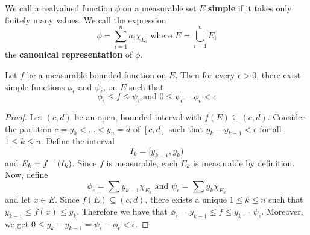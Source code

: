 \begin{definition}
    We call a realvalued function $\phi$ on a measurable set $E$ \textbf{simple}
    if it takes only finitely many values. We call the expression
    \begin{equation*}
        \phi=\sum_{i=1}^n{a_i\chi_E_i} \text{ where } E=\bigcup_{i=1}^n{E_i}
    \end{equation*}
    the \textbf{canonical representation} of $\phi$.
\end{definition}

\begin{lemma}\label{9.2.2}
    Let $f$ be a measurable bounded function on  $E$. Then for every
    $\epsilon>0$, there exist simple functions  $\phi_\epsilon$ and
    $\psi_\epsilon$, on $E$ such that
    \begin{equation*}
        \phi_\epsilon \leq f \leq \psi_\epsilon \text{ and } 0 \leq
        \psi_\epsilon-\phi_\epsilon<\epsilon
    \end{equation*}
\end{lemma}
\begin{proof}
    Let $(c,d)$ be an open, bounded interval with $f(E) \subseteq (c,d)$.
    Consider the partition $c=y_0<\dots<y_n=d$ of $[c,d]$ such that
    $y_k-y_{k-1}<\epsilon$ for all $1 \leq k \leq n$. Define the interval
    \begin{equation*}
        I_k=[y_{k-1}, y_k)
    \end{equation*}
    and $E_k=f^{-1}(I_k)$. Since $f$ is measurable, each  $E_k$ is measurable
    by definition. Now, define
    \begin{equation*}
        \phi_\epsilon=\sum{y_{k-1}\chi_{E_k}} \text{ and }
        \psi_\epsilon=\sum{y_k\chi_{E_k}}
    \end{equation*}
    and let $x \in E$. Since $f(E) \subseteq (c,d)$, there exists a unique $1
    \leq k \leq n$ such that  $y_{k-1} \leq f(x) \leq y_k$. Therefore we have
    that $\phi_\epsilon=y_{k-1} \leq f \leq y_k=\psi_\epsilon$. Moreover, we get
    $0 \leq y_k-y_{k-1}=\psi_\epsilon-\phi_\epsilon<\epsilon$.
\end{proof}

